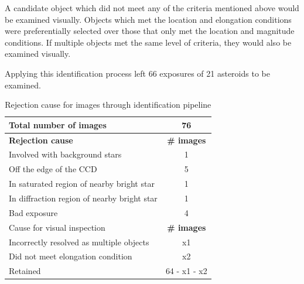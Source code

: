 \documentclass[iop,apj]{emulateapj}
\begin{document}

A candidate object which did not meet any of the criteria mentioned above would be examined visually. Objects which met the location and elongation conditions were preferentially selected over those that only met the location and magnitude conditions. If multiple objects met the same level of criteria, they would also be examined visually.


Applying this identification process left 66 exposures of 21 asteroids to be examined.

\begin{table}[htdp]
\caption{Rejection cause for images through identification pipeline}
\begin{center}
\begin{tabular}{lc}
	Total number of images							&	76 			\\
	\hline
	\textbf{Rejection cause}						& 	\textbf{\# images} \\
	\hline
	Involved with background stars                          & 	1			\\
	Off the edge of the CCD						& 	5			\\
	In saturated region of nearby bright star			& 	1			\\
	In diffraction region of nearby bright star		&	1			\\
	Bad exposure									& 	4			\\
	\hline
	Cause for visual inspection						&	\textbf{\# images} \\
	Incorrectly resolved as multiple objects			&	x1			\\
	Did not meet elongation condition				&	x2			\\
	Retained										&	64 - x1 - x2
\end{tabular}
\end{center}
\label{default}
\end{table}
\end{document}
